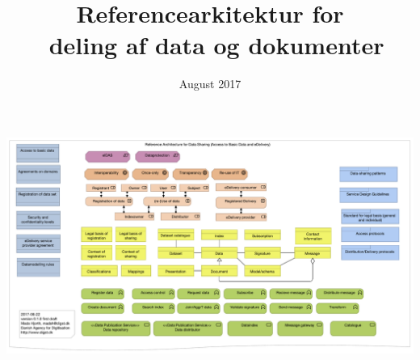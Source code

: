 \documentclass[12pt]{article}
\title{Referencearkitektur for \\ deling af data og dokumenter}
\author{}
\date{August 2017}
\begin{document}
\maketitle





\newpage
\thispagestyle{empty}
\includegraphics[angle=90, height=\textheight]{../overview.pdf}
\end{document}
